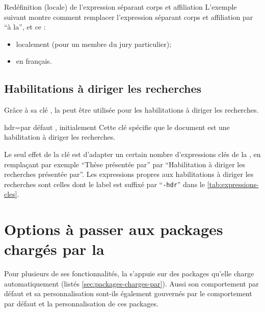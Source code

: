 \begin{dbexample}{Redéfinition (locale) de l'expression séparant corps et
    affiliation}{}
  L'exemple suivant montre comment remplacer l'expression séparant corps et
  affiliation par \enquote{\textvisiblespace{}à la\textvisiblespace{}}, et ce :
  \begin{itemize}
  \item localement (pour un membre du jury particulier);
  \item en français.
  \end{itemize}
\begin{bodycode}[listing options={showspaces}]
\end{bodycode}
\end{dbexample}

\subsection{Habilitations à diriger les recherches}
\label{sec:hdr}
%
Grâce à sa clé , la \yatcl{} peut être utilisée pour
les habilitations à diriger les recherches.

\begin{docKey}{hdr}{=\textbar{}}{par défaut
    , initialement }
  Cette clé spécifie que le document est une habilitation à diriger les
  recherches.
\end{docKey}

Le seul effet de la clé  est d'adapter un certain nombre
d'expressions clés de la \yatcl{}, en remplaçant par exemple \enquote{Thèse
  présentée par} par \enquote{Habilitation à diriger les recherches présentée
  par}. Les expressions propres aux habilitations à diriger les recherches sont
celles dont le label est suffixé par \enquote{\texttt{-hdr}} dans le
\vref{tab:expressions-cles}.

\section{Options à passer aux packages chargés par la \yatcl{}}
\label{sec:options-passer-aux}

Pour plusieurs de ses fonctionnalités, la \yatcl s'appuie sur des packages
qu'elle charge automatiquement (listés
\vref{sec:packages-charges-par}). Aussi son comportement par défaut et sa
personnalisation sont-ils également gouvernés par le comportement par défaut et
la personnalisation de ces packages.

